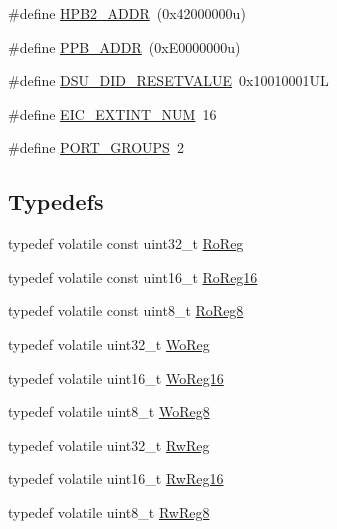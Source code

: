 \begin{DoxyCompactItemize}
\item 
\#define \mbox{\hyperlink{group___s_a_m_d21_j17_a__definitions_gaef42fa53ddf169a2a50be70d29f73571}{H\+P\+B2\+\_\+\+A\+D\+DR}}~(0x42000000u)
\item 
\#define \mbox{\hyperlink{group___s_a_m_d21_j17_a__definitions_ga8895d0a3a9a3126cc44330f86c8ce564}{P\+P\+B\+\_\+\+A\+D\+DR}}~(0x\+E0000000u)
\item 
\#define \mbox{\hyperlink{group___s_a_m_d21_j17_a__definitions_gada75131d542c9e1966238f5488f89bd6}{D\+S\+U\+\_\+\+D\+I\+D\+\_\+\+R\+E\+S\+E\+T\+V\+A\+L\+UE}}~0x10010001\+UL
\item 
\#define \mbox{\hyperlink{group___s_a_m_d21_j17_a__definitions_ga88ebc38c95506296f5d21f82476296ae}{E\+I\+C\+\_\+\+E\+X\+T\+I\+N\+T\+\_\+\+N\+UM}}~16
\item 
\#define \mbox{\hyperlink{group___s_a_m_d21_j17_a__definitions_gab9243ffe03a1dc631b57a495b4b3d467}{P\+O\+R\+T\+\_\+\+G\+R\+O\+U\+PS}}~2
\end{DoxyCompactItemize}
\subsection*{Typedefs}
\begin{DoxyCompactItemize}
\item 
typedef volatile const uint32\+\_\+t \mbox{\hyperlink{group___s_a_m_d21_j17_a__definitions_ga5d556f8391af4141be23f7334ac9dd68}{Ro\+Reg}}
\item 
typedef volatile const uint16\+\_\+t \mbox{\hyperlink{group___s_a_m_d21_j17_a__definitions_gaebf6e33c2d49a802e06e22a95ea9d0d0}{Ro\+Reg16}}
\item 
typedef volatile const uint8\+\_\+t \mbox{\hyperlink{group___s_a_m_d21_j17_a__definitions_ga0d957f1433aaf5d70e4dc2b68288442d}{Ro\+Reg8}}
\item 
typedef volatile uint32\+\_\+t \mbox{\hyperlink{group___s_a_m_d21_j17_a__definitions_gac0f96d4e8018367b38f527007cf0eafd}{Wo\+Reg}}
\item 
typedef volatile uint16\+\_\+t \mbox{\hyperlink{group___s_a_m_d21_j17_a__definitions_ga0ab0e5f6c8301aa1c2068e511d854094}{Wo\+Reg16}}
\item 
typedef volatile uint8\+\_\+t \mbox{\hyperlink{group___s_a_m_d21_j17_a__definitions_ga5e336e5a36ee12ebeafb021108e5275b}{Wo\+Reg8}}
\item 
typedef volatile uint32\+\_\+t \mbox{\hyperlink{group___s_a_m_d21_j17_a__definitions_gacf1496e3bbe303e55f627fc7558a68c7}{Rw\+Reg}}
\item 
typedef volatile uint16\+\_\+t \mbox{\hyperlink{group___s_a_m_d21_j17_a__definitions_gacce07556c80fc352ae607f225f19fed5}{Rw\+Reg16}}
\item 
typedef volatile uint8\+\_\+t \mbox{\hyperlink{group___s_a_m_d21_j17_a__definitions_gae361754be775bb192f85821d3ab33c17}{Rw\+Reg8}}
\end{DoxyCompactItemize}


